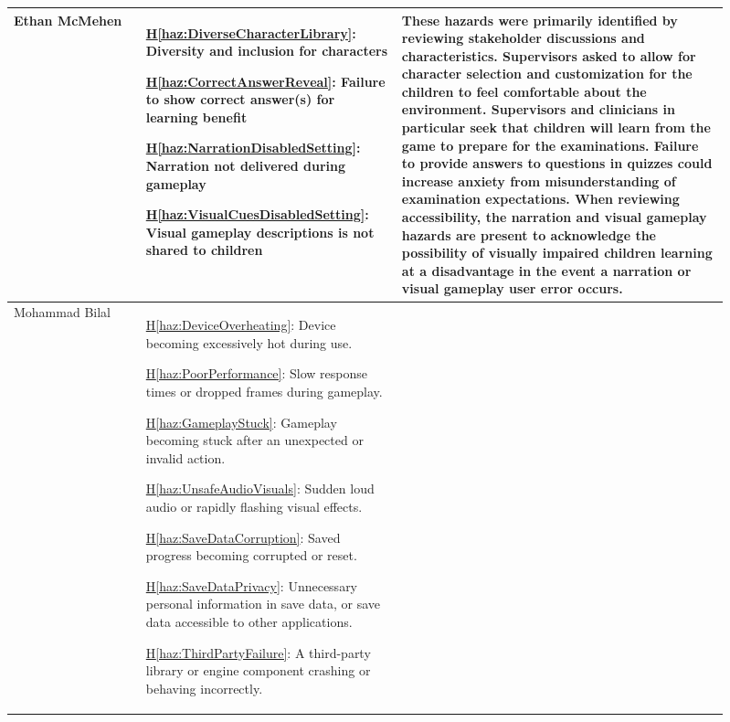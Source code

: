 \documentclass{article}
\newcounter{hazard}
\newcommand{\hazref}[1]{\hyperref[haz:#1]{H\ref*{haz:#1}}}
\begin{document}
\begin{enumerate}
\begin{longtable}{@{}
        p{0.17\linewidth}
        p{0.32\linewidth}
        p{0.42\linewidth}
    @{}}
    Ethan McMehen &
    \hazref{DiverseCharacterLibrary}: Diversity and inclusion for characters

    \hazref{CorrectAnswerReveal}: Failure to show correct answer(s) for learning benefit

    \hazref{NarrationDisabledSetting}: Narration not delivered during gameplay

    \hazref{VisualCuesDisabledSetting}: Visual gameplay descriptions is not shared to children
    &
    These hazards were primarily identified by reviewing stakeholder discussions 
    and characteristics. Supervisors asked to allow for character selection and 
    customization for the children to feel comfortable about the environment. 
    Supervisors and clinicians in particular seek that children will learn from 
    the game to prepare for the examinations. Failure to provide answers to questions in
    quizzes could increase anxiety from misunderstanding of examination expectations. 
    When reviewing accessibility, the narration and visual gameplay hazards are present 
    to acknowledge the possibility of visually impaired children learning at a disadvantage 
    in the event a narration or visual gameplay user error occurs.  \\
    \midrule

    Mohammad Bilal &
    \hazref{DeviceOverheating}: Device becoming excessively
    hot during use.

    \hazref{PoorPerformance}: Slow response times or dropped
    frames during gameplay.

    \hazref{GameplayStuck}: Gameplay becoming stuck after an
    unexpected or invalid action.

    \hazref{UnsafeAudioVisuals}: Sudden loud audio or rapidly
    flashing visual effects.

    \hazref{SaveDataCorruption}: Saved progress becoming
    corrupted or reset.

    \hazref{SaveDataPrivacy}: Unnecessary personal information
    in save data, or save data accessible to other applications.

    \hazref{ThirdPartyFailure}: A third-party library or engine
    component crashing or behaving incorrectly.


\end{longtable}
\end{enumerate}
\end{document}
